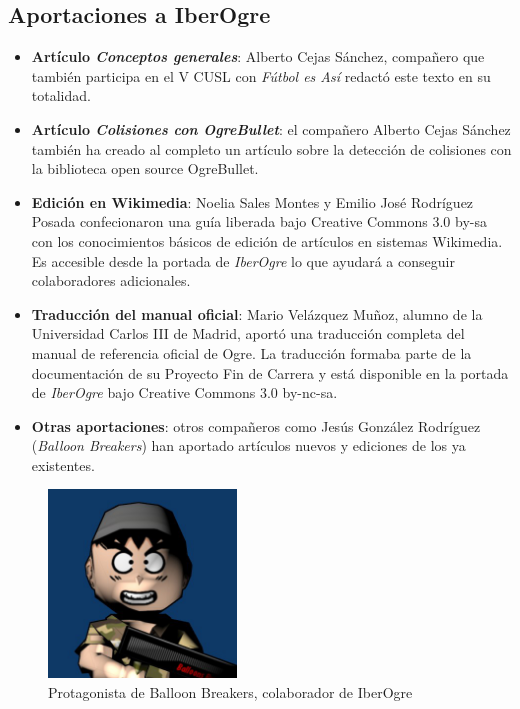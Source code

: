 \documentclass[16pt,spanish]{article}
\def \wiki{\emph{IberOgre} }
\begin{document}
\subsection{Aportaciones a IberOgre}

\begin{itemize}
    \item \textbf{Artículo \emph{Conceptos generales}}: Alberto Cejas Sánchez,
    compañero que también participa en el V CUSL con \emph{Fútbol es Así}
    redactó este texto en su totalidad.
    \item \textbf{Artículo \emph{Colisiones con OgreBullet}}: el compañero
    Alberto Cejas Sánchez también ha creado al completo un artículo sobre
    la detección de colisiones con la biblioteca open source OgreBullet.
    \item \textbf{Edición en Wikimedia}: Noelia Sales Montes y Emilio José
    Rodríguez Posada confecionaron una guía liberada bajo Creative Commons
    3.0 by-sa con los conocimientos básicos de edición de artículos en
    sistemas Wikimedia. Es accesible desde la portada de \wiki lo que
    ayudará a conseguir colaboradores adicionales.
    \item \textbf{Traducción del manual oficial}: Mario Velázquez Muñoz,
    alumno de la Universidad Carlos III de Madrid, aportó una traducción
    completa del manual de referencia oficial de Ogre. La traducción formaba
    parte de la documentación de su Proyecto Fin de Carrera y está disponible
    en la portada de \wiki bajo Creative Commons 3.0 by-nc-sa.
    \item \textbf{Otras aportaciones}: otros compañeros como Jesús
    González Rodríguez (\emph{Balloon Breakers}) han aportado artículos nuevos
    y ediciones de los ya existentes.
\end{itemize}

\begin{figure}[H]
    \centering
        \includegraphics[width=5cm]{img/avatar.jpg} 
    \caption{Protagonista de Balloon Breakers, colaborador de IberOgre}
    \label{img:balloon}
\end{figure}
\end{document}
